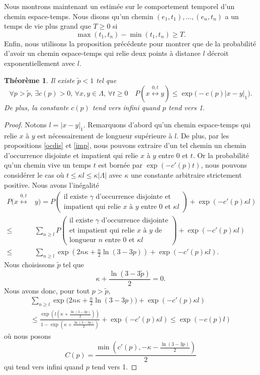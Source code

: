\documentclass[titlepage,a4paper,12pt]{article}
\newcounter{d}
\newcounter{t}
\newcounter{p}
\newcounter{c}
\newcounter{a}
\newcounter{l}
\newtheorem{thm}[t]{Théorème}
\begin{document}
Nous montrons maintenant un estimée sur le comportement temporel d'un chemin espace-temps. Nous disons qu'un chemin $(e_1,t_1),\dots,(e_n,t_n)$ a un temps de vie plus grand que $T\geqslant 0$ si $$ \max(t_1,t_n) -\min(t_1,t_n)\geqslant T.
$$
Enfin, nous utilisons la proposition précédente pour montrer que de la probabilité d'avoir un chemin espace-temps qui relie deux points à distance $l$ décroit exponentiellement avec $l$.
\begin{thm} Il existe $\tilde{p}< 1$ tel que 
$$\forall p > \tilde{p},\,\exists c(p)>0,\, \forall x,y \in \Lambda,\, \forall t \geqslant 0\quad P(x\overset{0,t}{\longleftrightarrow} y)\leqslant \exp\big(-c(p)|x-y|_1\big).
$$ De plus, la constante $c(p)$ tend vers infini quand $p$ tend vers 1.
\end{thm}
\begin{proof}
Notons $l = |x-y|_1$. Remarquons d'abord qu'un chemin espace-temps qui relie $x$ à $y$ est nécessairement de longueur supérieure à $l$. De plus, par les propositions \ref{ocdis} et \ref{imp}, nous pouvons extraire d'un tel chemin un chemin d'occurrence disjointe et impatient qui relie $x$ à $y$ entre $0$ et $t$. Or la probabilité qu'un chemin vive un temps $t$ est bornée par $\exp(-c'(p)t)$, nous pouvons considérer le cas où $t\leqslant \kappa l \leqslant \kappa |\Lambda|$ avec $\kappa$ une constante arbitraire strictement positive.  Nous avons l'inégalité
\begin{align*}
P(x\overset{0,t}{\longleftrightarrow}& y)=P\left(\begin{array}{c} \text{il existe }\gamma \text{ d'occurrence disjointe et}\\\text{impatient qui relie } x\text{ à }y\text{ entre }0\text{ et }\kappa l\end{array}\right) + \exp(-c'(p)\kappa l)\\
\leqslant& \sum_{n\geqslant l}P\left(\begin{array}{c} \text{il existe }\gamma \text{ d'occurrence disjointe}\\\text{et impatient qui relie } x\text{ à }y\text{ de}\\ \text{longueur }n\text{ entre }0\text{ et }\kappa l\end{array}\right) + \exp(-c'(p)\kappa l)\\
\leqslant& \sum_{n\geqslant l} \exp\left(2n\kappa+\frac{n}{2}\ln(3-3p)\right) + \exp(-c'(p)\kappa l).
\end{align*}
Nous choisissons $\tilde{p}$ tel que $$\kappa+\frac{\ln(3-3\tilde{p})}{2} = 0.$$ Nous avons donc, pour tout $p>\tilde{p}$,
\begin{multline*} \sum_{n\geqslant l} \exp\big(2n\kappa+\frac{n}{2}\ln(3-3p)\big) + \exp(-c'(p)\kappa l) \\
\leqslant \frac{\exp(l(\kappa+\frac{\ln(3-3p)}{2}))}{1-\exp(\kappa+\frac{\ln(3-3p)}{2})}+\exp(-c'(p)\kappa l)\leqslant \exp(-c(p)l)
\end{multline*}
où nous posons $$C(p) = \frac{\min(c'(p),-\kappa-\frac{\ln(3-3p)}{2})}{2}$$ qui tend vers infini quand $p$ tend vers 1.
\end{proof}
\end{document}
